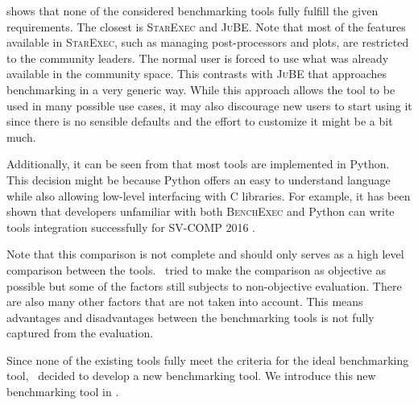  shows that none of the considered benchmarking tools fully fulfill the given requirements.
The closest is \textsc{StarExec} and \textsc{JuBE}.
Note that most of the features available in \textsc{StarExec}, such as managing post-processors and plots, are restricted to the community leaders.
The normal user is forced to use what was already available in the community space.
This contrasts with \textsc{JuBE} that approaches benchmarking in a very generic way.
While this approach allows the tool to be used in many possible use cases, it may also discourage new users to start using it since there is no sensible defaults and the effort to customize it might be a bit much.


Additionally, it can be seen from  that most tools are implemented in Python.
This decision might be because Python offers an easy to understand language while also allowing low-level interfacing with C libraries.
For example, it has been shown that developers unfamiliar with both \textsc{BenchExec} and Python can write tools integration successfully for SV-COMP 2016 \citep{beyerReliableBenchmarkingRequirements2019}.

Note that this comparison is not complete and should only serves as a high level comparison between the tools.
\First~tried to make the comparison as objective as possible but some of the factors still subjects to non-objective evaluation.
There are also many other factors that are not taken into account.
This means advantages and disadvantages between the benchmarking tools is not fully captured from the evaluation.

Since none of the existing tools fully meet the criteria for the ideal benchmarking tool, \first~decided to develop a new benchmarking tool.
We introduce this new benchmarking tool in .

